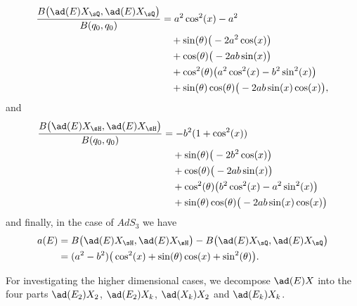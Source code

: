 \begin{equation}            \label{LONGEqKillingEXQEXQ}
    \begin{aligned}[]
        \frac{ B\big( \ad(E)X_{\sQ},\ad(E)X_{\sQ} \big)}{B(q_0,q_0)}&=a^2\cos^2(x)-a^2\\
                &\quad +\sin(\theta)\big( -2a^2\cos(x) \big)\\
                &\quad +\cos(\theta)\big( -2ab\sin(x) \big)\\
                &\quad +\cos^2(\theta)\big( a^2\cos^2(x)-b^2\sin^2(x) \big)\\
                &\quad +\sin(\theta)\cos(\theta)\big( -2ab\sin(x)\cos(x) \big),
    \end{aligned}
\end{equation}
and
\begin{equation}
    \begin{aligned}[]
        \frac{ B\big( \ad(E)X_{\sH},\ad(E)X_{\sH} \big)}{B(q_0,q_0)}&= -b^2(1+\cos^2(x))\\
                            &\quad +\sin(\theta)\big( -2b^2\cos(x) \big)\\
                            &\quad +\cos(\theta)\big( -2ab\sin(x) \big)\\
                            &\quad +\cos^2(\theta)\big( b^2\cos^2(x)-a^2\sin^2(x) \big)\\
                            &\quad +\sin(\theta)\cos(\theta)\big( -2ab\sin(x)\cos(x) \big)
    \end{aligned}
\end{equation}
and finally, in the case of $AdS_3$ we have
\begin{equation}        \label{LONGEqaEdansAdsTrois}
    \begin{aligned}[]
        a(E)&=B\big( \ad(E)X_{\sH},\ad(E)X_{\sH} \big)-B\big( \ad(E)X_{\sQ},\ad(E)X_{\sQ} \big)\\
            &=(a^2-b^2)\big( \cos^2(x)+\sin(\theta)\cos(x)+\sin^2(\theta) \big).
    \end{aligned}
\end{equation}

For investigating the higher dimensional cases, we decompose $\ad(E)X$ into the four parts $\ad(E_2)X_2$, $\ad(E_2)X_k$, $\ad(X_k)X_2$ and $\ad(E_k)X_k$.

